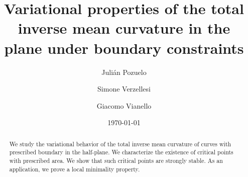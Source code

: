 \documentclass[11pt]{amsart}
\title[Variational properties of the total inverse mean curvature]{Variational properties of the total inverse mean curvature in the plane under boundary constraints}
\author[J. Pozuelo]{Juli\'an Pozuelo}
\author[S.~Verzellesi]{Simone Verzellesi}
\author[G.~Vianello]{Giacomo Vianello}
\date{\today}
\theoremstyle{definition}
\theoremstyle{remark}
\numberwithin{equation}{section}
\begin{document}
	
	
	
	\begin{abstract}
		We study the variational behavior of the total inverse mean curvature of curves with prescribed boundary in the half-plane. We characterize the existence of critical points with prescribed area. We show that such critical points are strongly stable. As an application, we prove a local minimality property. 
	\end{abstract}
	
	\maketitle
	
	
	
	
	
	
	
\end{document}
